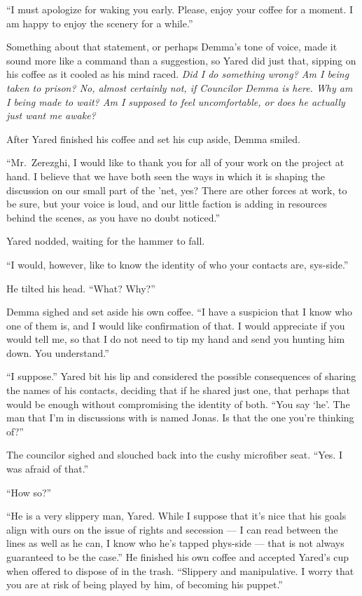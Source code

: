 ``I must apologize for waking you early. Please, enjoy your coffee for a moment. I am happy to enjoy the scenery for a while.''

Something about that statement, or perhaps Demma's tone of voice, made it sound more like a command than a suggestion, so Yared did just that, sipping on his coffee as it cooled as his mind raced. \emph{Did I do something wrong? Am I being taken to prison? No, almost certainly not, if Councilor Demma is here. Why am I being made to wait? Am I supposed to feel uncomfortable, or does he actually just want me awake?}

After Yared finished his coffee and set his cup aside, Demma smiled.

``Mr.~Zerezghi, I would like to thank you for all of your work on the project at hand. I believe that we have both seen the ways in which it is shaping the discussion on our small part of the 'net, yes? There are other forces at work, to be sure, but your voice is loud, and our little faction is adding in resources behind the scenes, as you have no doubt noticed.''

Yared nodded, waiting for the hammer to fall.

``I would, however, like to know the identity of who your contacts are, sys-side.''

He tilted his head. ``What? Why?''

Demma sighed and set aside his own coffee. ``I have a suspicion that I know who one of them is, and I would like confirmation of that. I would appreciate if you would tell me, so that I do not need to tip my hand and send you hunting him down. You understand.''

``I suppose.'' Yared bit his lip and considered the possible consequences of sharing the names of his contacts, deciding that if he shared just one, that perhaps that would be enough without compromising the identity of both. ``You say `he'. The man that I'm in discussions with is named Jonas. Is that the one you're thinking of?''

The councilor sighed and slouched back into the cushy microfiber seat. ``Yes. I was afraid of that.''

``How so?''

``He is a very slippery man, Yared. While I suppose that it's nice that his goals align with ours on the issue of rights and secession — I can read between the lines as well as he can, I know who he's tapped phys-side — that is not always guaranteed to be the case.'' He finished his own coffee and accepted Yared's cup when offered to dispose of in the trash. ``Slippery and manipulative. I worry that you are at risk of being played by him, of becoming his puppet.''

